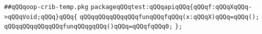 \label{src/app/tut/oop-crib-temp/oop-crib-temp.pkg}
\verb|##qQQqoop-crib-temp.pkg|\newline
\newline
\verb|packageqQQqtest:qQQqapiqQQq{qQQqf:qQQqXqQQq->qQQqVoid;qQQq}qQQq{|\newline
\newline
\verb|qQQqqQQqqQQqqQQqfunqQQqfqQQq(x:qQQqX)qQQq=qQQq();|\newline
\verb|qQQqqQQqqQQqqQQqfunqQQqgqQQq()qQQq=qQQqfqQQq0;|\newline
\verb|};|\newline
\newline

